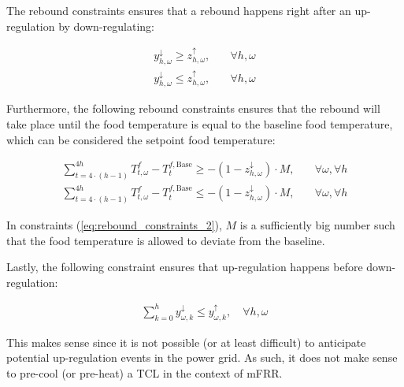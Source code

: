 {The rebound constraints ensures that a rebound happens right after an up-regulation by down-regulating:

\begin{subequations}\label{eq:rebound_constraints_1}
    \begin{align}
        y^{\downarrow}_{h, \omega} \geq z^{\uparrow}_{h, \omega}, \quad & \forall{h, \omega} \\
        y^{\downarrow}_{h, \omega} \leq z^{\uparrow}_{h, \omega}, \quad & \forall{h, \omega}
    \end{align}
\end{subequations}


Furthermore, the following rebound constraints ensures that the rebound will take place until the food temperature is equal to the baseline food temperature, which can be considered the setpoint food temperature:

\begin{subequations}\label{eq:rebound_constraints_2}
    \begin{align}
        \sum_{t=4\cdot(h-1)}^{4 h} T^{f}_{t, \omega} - T^{f, \text{Base}}_{t} \geq - (1 - z^{\downarrow}_{h, \omega}) \cdot M, \quad & \forall{\omega}, \forall{h} \\
        \sum_{t=4\cdot(h-1)}^{4 h} T^{f}_{t, \omega} - T^{f, \text{Base}}_{t} \leq - (1 - z^{\downarrow}_{h, \omega}) \cdot M, \quad & \forall{\omega}, \forall{h}
    \end{align}
\end{subequations}

In constraints (\ref{eq:rebound_constraints_2}), $M$ is a sufficiently big number such that the food temperature is allowed to deviate from the baseline.

Lastly, the following constraint ensures that up-regulation happens before down-regulation:

\begin{align}\label{eq:up_regulation_first}
    \sum_{k=0}^{h} y^{\downarrow}_{\omega, k} \leq y^{\uparrow}_{\omega, k}, \quad \forall{h, \omega}
\end{align}

This makes sense since it is not possible (or at least difficult) to anticipate potential up-regulation events in the power grid. As such, it does not make sense to pre-cool (or pre-heat) a TCL in the context of mFRR.



}
